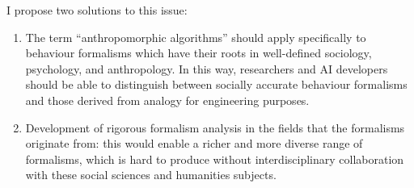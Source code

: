 I propose two solutions to this issue:

\begin{enumerate}
  \item The term ``anthropomorphic algorithms'' should apply specifically to behaviour formalisms which have their roots in well-defined sociology, psychology, and anthropology. In this way, researchers and AI developers should be able to distinguish between socially accurate behaviour formalisms and those derived from analogy for engineering purposes.
  \item Development of rigorous formalism analysis in the fields that the formalisms originate from: this would enable a richer and more diverse range of formalisms, which is hard to produce without interdisciplinary collaboration with these social sciences and humanities subjects.
\end{enumerate}
